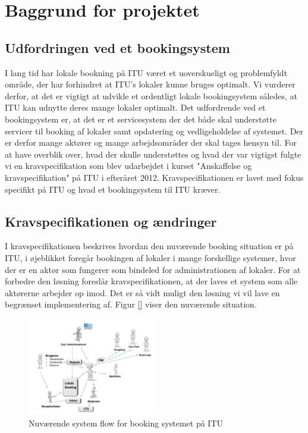 \chapter{Baggrund for projektet}
\label{Background}
\section{Udfordringen ved et bookingsystem}
\label{Baggrund_Udfording}
I lang tid har lokale bookning på ITU været et uoverskueligt og problemfyldt område, der har forhindret at ITU's lokaler kunne bruges optimalt. Vi vurderer derfor, at det er vigtigt at udvikle et ordentligt lokale bookingsystem således, at ITU kan udnytte deres mange lokaler optimalt. Det udfordrende ved et bookingsystem er, at det er et servicesystem der det både skal understøtte servicer til booking af lokaler samt opdatering og vedligeholdelse af systemet. Der er derfor mange aktører og mange arbejdsområder der skal tages hensyn til. For at have overblik over, hvad der skulle understøttes og hvad der var vigtigst fulgte vi en kravspecifikation som blev udarbejdet i kurset "Anskaffelse og kravspecifikation" på ITU i efteråret 2012. Kravspecifikationen er lavet med fokus specifikt på ITU og hvad et bookingsystem til ITU kræver.
\section{Kravspecifikationen og ændringer}
\label{Baggrund_kravspecifikationen}
I kravspecifikationen beskrives hvordan den nuværende booking situation er på ITU, i øjeblikket foregår bookingen af lokaler i mange forskellige systemer, hvor der er en aktør som fungerer som bindeled for administrationen af lokaler. For at forbedre den løsning foreslår kravspecifikationen, at der laves et system som alle aktørerne arbejder op imod. Det er så vidt muligt den løsning vi vil lave en begrænset implementering af. Figur \ref{} viser den nuværende situation.

\begin{figure}[h!]
  \centering
    \includegraphics[width=0.5\textwidth]{Appendix/GUI-Prototype/NuvaerendeFlow}
  \caption{Nuværende system flow for booking systemet på ITU}
\label{Baggrund_kravspecifikationen_NuvaerendeFlow}
\end{figure}

